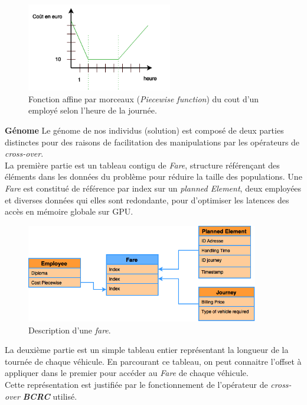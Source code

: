 \documentclass[french, 11pt]{memoir}
\begin{document}
\begin{figure}[htbp]
	\begin{center}
		\includegraphics[width=2.5in]{img/piecewise.png}
		\caption{Fonction affine par morceaux (\textit{Piecewise function}) du cout d'un employé selon l'heure de la journée.}
	\end{center}
\end{figure}


\textbf{Génome }Le génome de nos individus (solution) est composé de
deux parties distinctes pour des raisons de facilitation des
manipulations par les opérateurs de \emph{cross-over}. \\
La première partie est un tableau contigu de \emph{Fare}, structure
référençant des éléments dans les données du problème pour réduire la
taille des populations. Une \emph{Fare} est constitué de référence par
index sur un \emph{planned Element}, deux employées et diverses données
qui elles sont redondante, pour d'optimiser les latences des accès en
mémoire globale sur GPU.

\begin{figure}[htbp]
	\begin{center}
		\includegraphics[width=4in]{img/Fare.png}
		\caption{Description d'une \textit{fare}.}
	\end{center}
\end{figure}

La deuxième partie est un simple tableau entier représentant la longueur
de la tournée de chaque véhicule. En parcourant ce tableau, on peut
connaitre l'offset à appliquer dans le premier pour accéder au
\emph{Fare} de chaque véhicule. \\
Cette représentation est justifiée par le fonctionnement de l'opérateur
de \emph{cross-over} \emph{\textbf{BCRC}\cite{ombuki2006multi}} utilisé.
\end{document}

